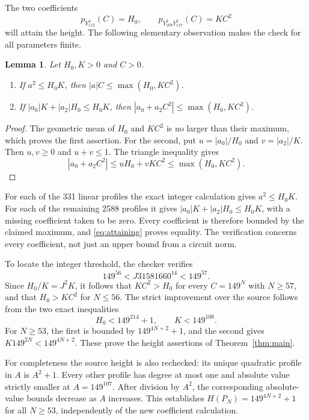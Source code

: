 \documentclass[11pt,a4paper]{article}
\newtheorem{lemma}[theorem]{Lemma}
\begin{document}
The two coefficients
\begin{equation}\label{eq:attaining}
 p_{Y_{112}^4}(C)=H_0,\qquad
 p_{Y_{109}^2Y_{117}^2}(C)=KC^2
\end{equation}
will attain the height. The following elementary observation makes the
check for all parameters finite.

\begin{lemma}\label{lem:envelope}
Let $H_0,K>0$ and $C>0$.
\begin{enumerate}
\item If $a^2\le H_0K$, then $|a|C\le\max(H_0,KC^2)$.
\item If $|a_0|K+|a_2|H_0\le H_0K$, then
$|a_0+a_2C^2|\le\max(H_0,KC^2)$.
\end{enumerate}
\end{lemma}
\begin{proof}
The geometric mean of $H_0$ and $KC^2$ is no larger than their maximum,
which proves the first assertion. For the second, put $u=|a_0|/H_0$
and $v=|a_2|/K$. Then $u,v\ge0$ and $u+v\le1$. The triangle
inequality gives
\[
 |a_0+a_2C^2|\le uH_0+vKC^2\le\max(H_0,KC^2).
\]
\end{proof}

For each of the 331 linear profiles the exact integer calculation gives
$a^2\le H_0K$. For each of the remaining 2588 profiles it gives
$|a_0|K+|a_2|H_0\le H_0K$, with a missing coefficient taken to be zero.
Every coefficient is therefore bounded by the claimed maximum, and
\eqref{eq:attaining} proves equality. The verification concerns every
coefficient, not just an upper bound from a circuit norm.

To locate the integer threshold, the checker verifies
\[
 149^{56}<J31581660^{14}<149^{57}.
\]
Since $H_0/K=J^2K$, it follows that $KC^2>H_0$ for every
$C=149^N$ with $N\ge57$, and that $H_0>KC^2$ for $N\le56$.
The strict improvement over the source follows from the two exact
inequalities
\[
 H_0<149^{214}+1,\qquad K<149^{108}.
\]
For $N\ge53$, the first is bounded by $149^{4N+2}+1$, and the second
gives $K149^{2N}<149^{4N+2}$. These prove the height assertions of
Theorem~\ref{thm:main}.

For completeness the source height is also rechecked: its unique
quadratic profile in $A$ is $A^2+1$. Every other profile has degree at
most one and absolute value strictly smaller at $A=149^{107}$.
After division by $A^2$, the corresponding absolute-value bounds decrease
as $A$ increases. This establishes $H(P_N)=149^{4N+2}+1$ for all
$N\ge53$, independently of the new coefficient calculation.
\end{document}
